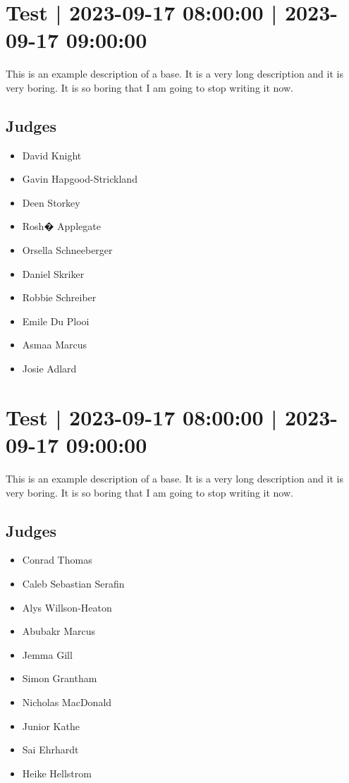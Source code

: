 \documentclass[10pt]{article}
\begin{document}
			\setcounter{section}{29}
	\section{Test | 2023-09-17 08:00:00 | 2023-09-17 09:00:00}
	This is an example description of a base. It is a very long description and it is very boring. It is so boring that I am going to stop writing it now.

	\subsection*{Judges}
	\begin{itemize}

			\item David Knight
			\item Gavin Hapgood-Strickland
			\item Deen Storkey
			\item Rosh� Applegate
			\item Orsella Schneeberger
			\item Daniel Skriker
			\item Robbie Schreiber
			\item Emile Du Plooi
			\item Asmaa Marcus
			\item Josie Adlard
		\end{itemize}

			\setcounter{section}{30}
	\section{Test | 2023-09-17 08:00:00 | 2023-09-17 09:00:00}
	This is an example description of a base. It is a very long description and it is very boring. It is so boring that I am going to stop writing it now.

	\subsection*{Judges}
	\begin{itemize}

			\item Conrad Thomas
			\item Caleb Sebastian Serafin
			\item Alys Willson-Heaton
			\item Abubakr Marcus
			\item Jemma Gill
			\item Simon Grantham
			\item Nicholas MacDonald
			\item Junior Kathe
			\item Sai Ehrhardt
			\item Heike Hellstrom
		\end{itemize}
\end{document}
